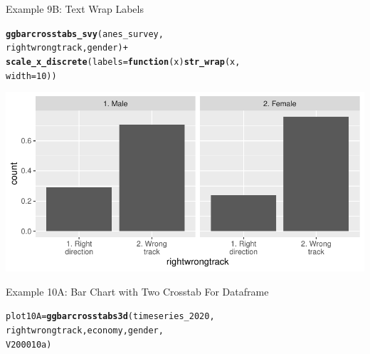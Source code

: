 \documentclass{beamer}\usepackage[]{graphicx}\usepackage[]{xcolor}
\makeatletter
\newcommand{\hlnum}[1]{\textcolor[rgb]{0.686,0.059,0.569}{#1}}%
\newcommand{\hlopt}[1]{\textcolor[rgb]{0,0,0}{#1}}%
\newcommand{\hlstd}[1]{\textcolor[rgb]{0.345,0.345,0.345}{#1}}%
\newcommand{\hlkwa}[1]{\textcolor[rgb]{0.161,0.373,0.58}{\textbf{#1}}}%
\newcommand{\hlkwb}[1]{\textcolor[rgb]{0.69,0.353,0.396}{#1}}%
\newcommand{\hlkwc}[1]{\textcolor[rgb]{0.333,0.667,0.333}{#1}}%
\newcommand{\hlkwd}[1]{\textcolor[rgb]{0.737,0.353,0.396}{\textbf{#1}}}%
\newenvironment{kframe}{%
 \def\at@end@of@kframe{}%
 \ifinner\ifhmode%
  \def\at@end@of@kframe{\end{minipage}}%
  \begin{minipage}{\columnwidth}%
 \fi\fi%
 \def\FrameCommand##1{\hskip\@totalleftmargin \hskip-\fboxsep
 \colorbox{shadecolor}{##1}\hskip-\fboxsep
     \hskip-\linewidth \hskip-\@totalleftmargin \hskip\columnwidth}%
 \MakeFramed {\advance\hsize-\width
   \@totalleftmargin\z@ \linewidth\hsize
   \@setminipage}}%
 {\par\unskip\endMakeFramed%
 \at@end@of@kframe}
\newenvironment{knitrout}{}{} %
\makeatother
\begin{document}
\begin{frame}[fragile]{Example 9B: Text Wrap Labels}

\begin{knitrout}
\color{fgcolor}\begin{kframe}
\begin{alltt}
\hlkwd{ggbarcrosstabs_svy}\hlstd{(anes_survey,}
    \hlstd{rightwrongtrack, gender)} \hlopt{+}
    \hlkwd{scale_x_discrete}\hlstd{(}\hlkwc{labels} \hlstd{=} \hlkwa{function}\hlstd{(}\hlkwc{x}\hlstd{)} \hlkwd{str_wrap}\hlstd{(x,}
        \hlkwc{width} \hlstd{=} \hlnum{10}\hlstd{))}
\end{alltt}
\end{kframe}
\includegraphics[width=0.95\linewidth]{figure/unnamed-chunk-56-1} 
\end{knitrout}
\end{frame}


\begin{frame}[fragile]{Example 10A: Bar Chart with Two Crosstab For Dataframe}

\begin{knitrout}
\color{fgcolor}\begin{kframe}
\begin{alltt}
\hlstd{plot10A} \hlkwb{=} \hlkwd{ggbarcrosstabs3d}\hlstd{(timeseries_2020,}
    \hlstd{rightwrongtrack, economy, gender,}
    \hlstd{V200010a)}
\end{alltt}
\end{kframe}
\end{knitrout}
\end{frame}
\end{document}
